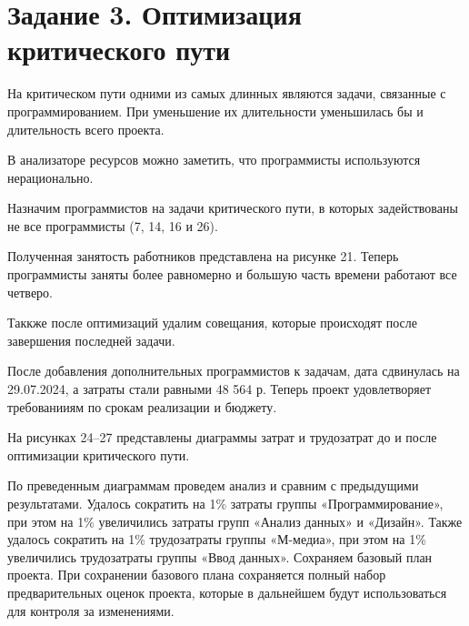 \section*{Задание 3. Оптимизация критического пути}

На критическом пути одними из самых длинных являются задачи, связанные с программированием. При уменьшение их длительности уменьшилась бы и длительность всего проекта.


В анализаторе ресурсов можно заметить, что программисты используются нерационально.

\newpage
Назначим программистов на задачи критического пути, в которых задействованы не все программисты (7, 14, 16 и 26).


Полученная занятость работников представлена на рисунке 21. Теперь программисты заняты более равномерно и большую часть времени работают все четверо.


Таккже после оптимизаций удалим совещания, которые происходят после завершения последней задачи.


После добавления дополнительных программистов к задачам, дата сдвинулась на 29.07.2024, а затраты стали равными 48 564 р. Теперь проект удовлетворяет требованииям по срокам реализации и бюджету.


На рисунках 24–27 представлены диаграммы затрат и трудозатрат до и после оптимизации критического пути.

По преведенным диаграммам проведем анализ и сравним с предыдущими результатами. Удалось сократить на 1\% затраты группы «Программирование», при этом на 1\% увеличились затраты групп «Анализ данных» и «Дизайн». Также удалось сократить на 1\% трудозатраты группы «М-медиа», при этом на 1\% увеличились трудозатраты группы «Ввод данных».
\newpage
{}
\newpage
{}
\newpage
Сохраняем базовый план проекта. При сохранении базового плана сохраняется полный набор предварительных оценок проекта, которые в дальнейшем будут использоваться для контроля за изменениями.

